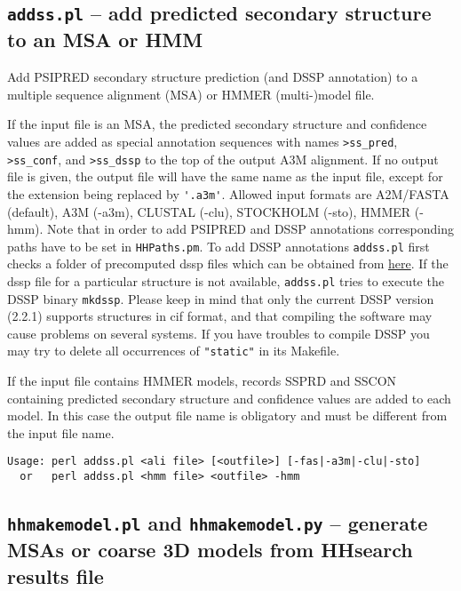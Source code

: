 \documentclass[11pt,a4paper]{article}
\begin{document}
\subsection{{\tt addss.pl} -- add predicted secondary structure to an MSA or HMM}
Add PSIPRED secondary structure prediction (and DSSP annotation) to a multiple sequence alignment (MSA) 
or HMMER (multi-)model file. 

If the input file is an MSA, the predicted secondary structure and confidence values are added as 
special annotation sequences with names \verb`>ss_pred`, \verb`>ss_conf`, and \verb`>ss_dssp` to the top of the output 
A3M alignment. If no output file is given, the output file will have the same name as the input file, 
except for the extension being replaced by \verb`'.a3m'`. Allowed input formats are A2M/FASTA (default), 
A3M (-a3m), CLUSTAL (-clu), STOCKHOLM (-sto), HMMER (-hmm). Note that in order to add PSIPRED and DSSP annotations corresponding paths
have to be set in \verb`HHPaths.pm`. To add DSSP annotations \verb`addss.pl` first checks a folder of precomputed dssp files which 
can be obtained from \href{http://www.cmbi.ru.nl/dssp.html}{here}. If the dssp file for a particular structure is not available, \verb`addss.pl` tries to 
execute the DSSP binary \verb`mkdssp`. Please keep in mind that only the current DSSP version (2.2.1) supports structures in cif format, and that compiling the software 
may cause problems on several systems. If you have troubles to compile DSSP you may try to delete all occurrences of \verb`"static"` in its Makefile.

If the input file contains HMMER models, records SSPRD and SSCON containing predicted secondary 
structure and confidence values are added to each model. In this case the output file name is 
obligatory and must be different from the input file name.

\small 
\begin{verbatim}
Usage: perl addss.pl <ali file> [<outfile>] [-fas|-a3m|-clu|-sto]  
  or   perl addss.pl <hmm file> <outfile> -hmm  
\end{verbatim} 
\normalsize


\subsection{{\tt hhmakemodel.pl} and {\tt hhmakemodel.py} -- generate MSAs or coarse 3D models from HHsearch results file}
\end{document}

